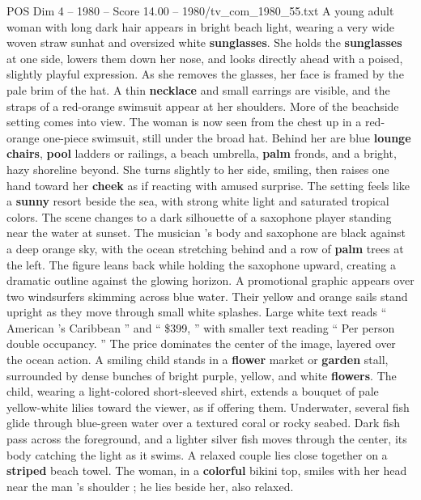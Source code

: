 \begin{textsample}{POS Dim 4 – 1980 – Score 14.00 – 1980/tv\_com\_1980\_55.txt}  \label{ex:f4_pos_044}
A young adult woman with long dark hair appears in bright beach light, wearing a very wide woven straw sunhat and oversized white \textbf{sunglasses}.
She holds the \textbf{sunglasses} at one side, lowers them down her nose, and looks directly ahead with a poised, slightly playful expression.
As she removes the glasses, her face is framed by the pale brim of the hat.
A thin \textbf{necklace} and small earrings are visible, and the straps of a red-orange swimsuit appear at her shoulders.
More of the beachside setting comes into view.
The woman is now seen from the chest up in a red-orange one-piece swimsuit, still under the broad hat.
Behind her are blue \textbf{lounge} \textbf{chairs}, \textbf{pool} ladders or railings, a beach umbrella, \textbf{palm} fronds, and a bright, hazy shoreline beyond.
She turns slightly to her side, smiling, then raises one hand toward her \textbf{cheek} as if reacting with amused surprise.
The setting feels like a \textbf{sunny} resort beside the sea, with strong white light and saturated tropical colors.
The scene changes to a dark silhouette of a saxophone player standing near the water at sunset.
The musician ’s body and saxophone are black against a deep orange sky, with the ocean stretching behind and a row of \textbf{palm} trees at the left.
The figure leans back while holding the saxophone upward, creating a dramatic outline against the glowing horizon.
A promotional graphic appears over two windsurfers skimming across blue water.
Their yellow and orange sails stand upright as they move through small white splashes.
Large white text reads “ American ’s Caribbean ” and “ \$399, ” with smaller text reading “ Per person double occupancy. ” The price dominates the center of the image, layered over the ocean action.
A smiling child stands in a \textbf{flower} market or \textbf{garden} stall, surrounded by dense bunches of bright purple, yellow, and white \textbf{flowers}.
The child, wearing a light-colored short-sleeved shirt, extends a bouquet of pale yellow-white lilies toward the viewer, as if offering them.
Underwater, several fish glide through blue-green water over a textured coral or rocky seabed.
Dark fish pass across the foreground, and a lighter silver fish moves through the center, its body catching the light as it swims.
A relaxed couple lies close together on a \textbf{striped} beach towel.
The woman, in a \textbf{colorful} bikini top, smiles with her head near the man ’s shoulder ; he lies beside her, also relaxed.

\end{textsample}
